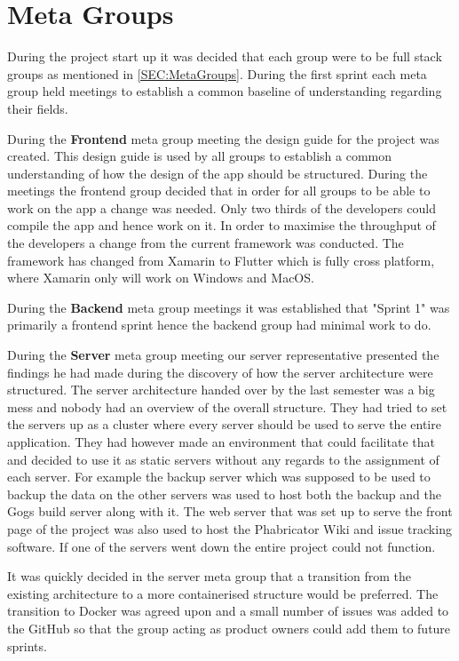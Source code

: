 \section{Meta Groups}
During the project start up it was decided that each group were to be full stack groups as mentioned in \autoref{SEC:MetaGroups}.
During the first sprint each meta group held meetings to establish a common baseline of understanding regarding their fields. 

During the \textbf{Frontend} meta group meeting the design guide for the project was created. 
This design guide is used by all groups to establish a common understanding of how the design of the app should be structured. 
During the meetings the frontend group decided that in order for all groups to be able to work on the app a change was needed. 
Only two thirds of the developers could compile the app and hence work on it. 
In order to maximise the throughput of the developers a change from the current framework was conducted.
The framework has changed from Xamarin to Flutter which is fully cross platform, where Xamarin only will work on Windows and MacOS. 

During the \textbf{Backend} meta group meetings it was established that "Sprint 1" was primarily a frontend sprint hence the backend group had minimal work to do. 

During the \textbf{Server} meta group meeting our server representative presented the findings he had made during the discovery of how the server architecture were structured. 
The server architecture handed over by the last semester was a big mess and nobody had an overview of the overall structure.
They had tried to set the servers up as a cluster where every server should be used to serve the entire application. 
They had however made an environment that could facilitate that and decided to use it as static servers without any regards to the assignment of each server. 
For example the backup server which was supposed to be used to backup the data on the other servers was used to host both the backup and the Gogs build server along with it. 
The web server that was set up to serve the front page of the project was also used to host the Phabricator Wiki and issue tracking software.
If one of the servers went down the entire project could not function. 

It was quickly decided in the server meta group that a transition from the existing architecture to a more containerised structure would be preferred. 
The transition to Docker was agreed upon and a small number of issues was added to the GitHub so that the group acting as product owners could add them to future sprints. 
